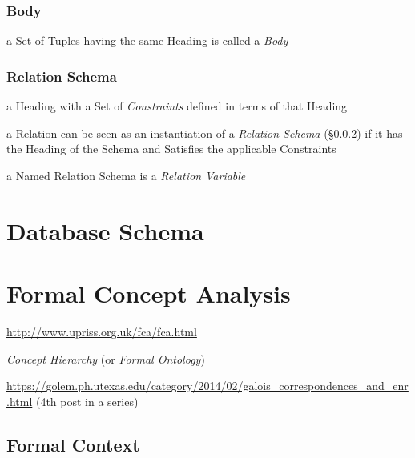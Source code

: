 \subsubsection{Body}\label{sec:body}

a Set of Tuples having the same Heading is called a \emph{Body}



\subsubsection{Relation Schema}\label{sec:relation_schema}

a Heading with a Set of \emph{Constraints} defined in terms of that Heading

a Relation can be seen as an instantiation of a \emph{Relation Schema}
(\S\ref{sec:relation_schema}) if it has the Heading of the Schema and Satisfies
the applicable Constraints

a Named Relation Schema is a \emph{Relation Variable}



\section{Database Schema}\label{sec:database_schema}

\section{Formal Concept Analysis}\label{sec:fca}


\url{http://www.upriss.org.uk/fca/fca.html}

\emph{Concept Hierarchy} (or \emph{Formal Ontology})

\url{https://golem.ph.utexas.edu/category/2014/02/galois_correspondences_and_enr.html}
(4th post in a series)



\subsection{Formal Context}\label{sec:formal_context}


